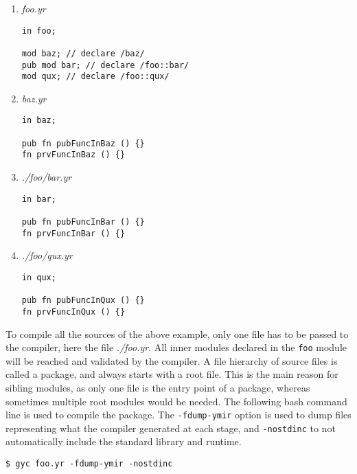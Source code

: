 \begin{enumerate}
\item\textit{foo.yr}
  \begin{lstlisting}[style=coloredverbatim]
in foo;

mod baz; // declare /baz/
pub mod bar; // declare /foo::bar/
mod qux; // declare /foo::qux/

  \end{lstlisting}

\item{\textit{baz.yr}}

  \begin{lstlisting}[style=coloredverbatim]
in baz;

pub fn pubFuncInBaz () {}
fn prvFuncInBaz () {}
  \end{lstlisting}

\item \textit{./foo/bar.yr}

  \begin{lstlisting}[style=coloredverbatim]
in bar;

pub fn pubFuncInBar () {}
fn prvFuncInBar () {}
  \end{lstlisting}


\item{\textit{./foo/qux.yr}}

  \begin{lstlisting}[style=coloredverbatim]
in qux;

pub fn pubFuncInQux () {}
fn prvFuncInQux () {}
  \end{lstlisting}

\end{enumerate}



To compile all the sources of the above example, only one file has to be passed
to the compiler, here the file \textit{./foo.yr}. All inner modules declared in
the \texttt{foo} module will be reached and validated by the compiler. A file
hierarchy of source files is called a package, and always starts with a root
file. This is the main reason for sibling modules, as only one file is the entry
point of a package, whereas sometimes multiple root modules would be needed. The
following bash command line is used to compile the package. The
\texttt{-fdump-ymir} option is used to dump files representing what the compiler
generated at each stage, and \texttt{-nostdinc} to not automatically include the
standard library and runtime.

\begin{lstlisting}[style=intermediateVerb]
$ gyc foo.yr -fdump-ymir -nostdinc
\end{lstlisting}

